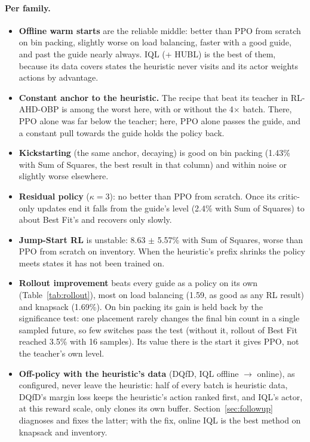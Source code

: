 \documentclass[11pt,a4paper]{article}
\begin{document}
\paragraph{Per family.}
\begin{itemize}[leftmargin=*]
\item \textbf{Offline warm starts} are the reliable middle: better than PPO from scratch on bin packing, slightly
  worse on load balancing, faster with a good guide, and past the guide nearly always. IQL (+ HUBL) is the best of them, because its data covers states the heuristic
  never visits and its actor weights actions by advantage.
\item \textbf{Constant anchor to the heuristic.} The recipe that beat its teacher in RL-AHD-OBP is among the worst
  here, with or without the 4$\times$ batch. There, PPO alone was far below the teacher; here, PPO alone passes the
  guide, and a constant pull towards the guide holds the policy back.
\item \textbf{Kickstarting} (the same anchor, decaying) is good on bin packing (1.43\% with Sum of Squares, the best
  result in that column) and within noise or slightly worse elsewhere.
\item \textbf{Residual policy} ($\kappa = 3$): no better than PPO from scratch. Once its critic-only updates end it
  falls from the guide's level (2.4\% with Sum of Squares) to about Best Fit's and recovers only slowly.
\item \textbf{Jump-Start RL} is unstable: 8.63 $\pm$ 5.57\% with Sum of Squares, worse than PPO from scratch on
  inventory. When the heuristic's prefix shrinks the policy meets states it has not been trained on.
\item \textbf{Rollout improvement} beats every guide as a policy on its own (Table~\ref{tab:rollout}), most on load
  balancing (1.59, as good as any RL result) and knapsack (1.69\%). On bin packing its gain is held back by the
  significance test: one placement rarely changes the final bin count in a single sampled future, so few switches
  pass the test (without it, rollout of Best Fit reached 3.5\% with 16 samples). Its value there is the start it
  gives PPO, not the teacher's own level.
\item \textbf{Off-policy with the heuristic's data} (DQfD, IQL offline $\to$ online), as configured, never leave the
  heuristic: half of every batch is heuristic data, DQfD's margin loss keeps the heuristic's action ranked first, and
  IQL's actor, at this reward scale, only clones its own buffer. Section~\ref{sec:followup} diagnoses and fixes the
  latter; with the fix, online IQL is the best method on knapsack and inventory.
\end{itemize}
\end{document}
